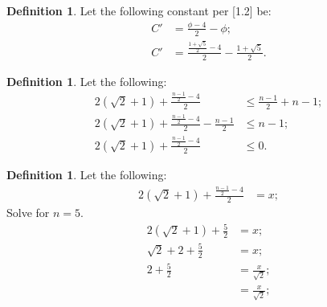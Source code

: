 \documentclass[10pt]{article}
\theoremstyle{plain}
\theoremstyle{definition}
\newtheorem{definition}[theorem]{Definition}
\theoremstyle{remark}
\begin{document}
	\begin{definition}
		Let the following constant per [1.2] be:
		\begin{align*}
			C' &= \frac{\phi - 4}{2} - \phi;\\
			C' &= \frac{\frac{1+\sqrt{5}}{2} - 4}{2} - \frac{1+\sqrt{5}}{2}.
		\end{align*}
	\end{definition}
	
	\begin{definition}
		Let the following:
		\begin{align*}
			2(\sqrt{2} + 1) + \frac{\frac{n - 1}{2} - 4}{2}  &\leq \frac{n - 1}{2} + n - 1;\\
			2(\sqrt{2} + 1) + \frac{\frac{n - 1}{2} - 4}{2} - \frac{n - 1}{2} &\leq n - 1;\\
			2(\sqrt{2} + 1) + \frac{\frac{n - 1}{2} - 4}{2} &\leq 0.
		\end{align*}
	\end{definition}
	
	\begin{definition}
		Let the following:
		\begin{align*}
			2(\sqrt{2} + 1) + \frac{\frac{n - 1}{2} - 4}{2} &= x;
		\end{align*}
		Solve for $n=5.$
		\begin{align*}
			2(\sqrt{2} + 1) + \frac{5}{2} &= x;\\
			\sqrt{2}+2 + \frac{5}{2} &= x;\\
			2+\frac{5}{2} &= \frac{x}{\sqrt{2}};\\
			&= \frac{x}{\sqrt{2}};
		\end{align*}
	\end{definition}
	
	\nocite{*}
	
	
	
	
\end{document}
